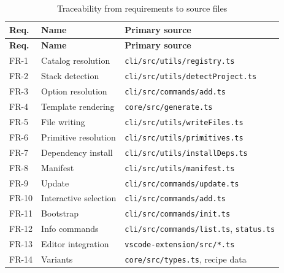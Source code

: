\begin{longtable}{@{}L{1.6cm}L{5.4cm}L{7.4cm}@{}}
\caption{Traceability from requirements to source files}\\
\toprule
\textbf{Req.} & \textbf{Name} & \textbf{Primary source} \\
\midrule
\endfirsthead
\toprule
\textbf{Req.} & \textbf{Name} & \textbf{Primary source} \\
\midrule
\endhead
FR-1 & Catalog resolution & \texttt{cli/src/utils/registry.ts} \\
FR-2 & Stack detection & \texttt{cli/src/utils/detectProject.ts} \\
FR-3 & Option resolution & \texttt{cli/src/commands/add.ts} \\
FR-4 & Template rendering & \texttt{core/src/generate.ts} \\
FR-5 & File writing & \texttt{cli/src/utils/writeFiles.ts} \\
FR-6 & Primitive resolution & \texttt{cli/src/utils/primitives.ts} \\
FR-7 & Dependency install & \texttt{cli/src/utils/installDeps.ts} \\
FR-8 & Manifest & \texttt{cli/src/utils/manifest.ts} \\
FR-9 & Update & \texttt{cli/src/commands/update.ts} \\
FR-10 & Interactive selection & \texttt{cli/src/commands/add.ts} \\
FR-11 & Bootstrap & \texttt{cli/src/commands/init.ts} \\
FR-12 & Info commands & \texttt{cli/src/commands/list.ts}, \texttt{status.ts} \\
FR-13 & Editor integration & \texttt{vscode-extension/src/*.ts} \\
FR-14 & Variants & \texttt{core/src/types.ts}, recipe data \\
\bottomrule
\end{longtable}
